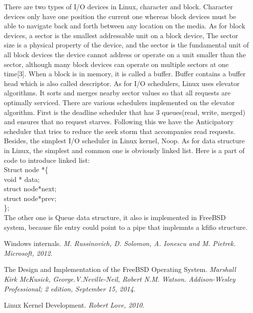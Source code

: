 \documentclass[10pt,draftclsnofoot,peerreview,letterpaper,onecolumn,]{IEEEtran}
\begin{document}
There are two types of I/O devices in Linux, character and block. Character devices only have one position the current one whereas block devices must be able to navigate back and forth between any location on the media. As for block devices, a sector is the smallest addressable unit on a block device, The sector size is a physical property of the device, and the sector is the fundamental unit of all block devices the device cannot address or operate on a unit smaller than the sector, although many block devices can operate on multiple sectors at one time[3]. When a block is in memory, it is called a buffer. Buffer contains a buffer head which is also called descriptor. As for I/O schedulers, Linux uses elevator algorithms. It sorts and merges nearby sector values so that all requests are optimally serviced. There are various schedulers implemented on the elevator algorithm. First is the deadline scheduler that has 3 queues(read, write, merged) and ensures that no request starves. Following this we have the Anticipatory scheduler that tries to reduce the seek storm that accompanies read requests. Besides, the simplest I/O scheduler in Linux kernel, Noop. As for data structure in Linux, the simplest and common one is obviously linked list.  Here is a part of code to introduce linked list:
~\\ Struct node *\{
~\\ void * data;
~\\ struct  node*next;
~\\ struct  node*prev;
~\\ \};
~\\ The other one is Queue data structure, it also is implemented in FreeBSD system, because file entry could point to a pipe that implemnts a kfifio structure.


\begin{thebibliography}{1}

 Windows internals.
\textit{M. Russinovich, D. Solomon, A. Ionescu and M. Pietrek.}
\textit{Microsoft, 2012}.

 The Design and Implementation of the FreeBSD Operating System.
\textit{Marshall Kirk McKusick, George.V.Neville-Neil, Robert N.M. Watson.}
\textit{Addison-Wesley Professional; 2 edition, September 15, 2014}.

Linux Kernel Development.
\textit{Robert Love, 2010}.

\end{thebibliography}
\end{document}
